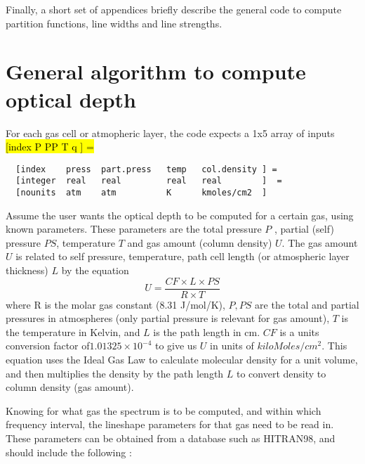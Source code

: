 \documentclass[11pt]{article}
\begin{document}
Finally, a short set of appendices briefly describe the general code to 
compute partition functions, line widths and line strengths. 

\newpage
\section{General algorithm to compute optical depth}
For each gas cell or atmopheric layer, the code expects a 1x5 array of 
inputs \\
\hl{[index   P   PP    T   q     ] = }
\\
\begin{verbatim}
  [index    press  part.press   temp   col.density ] = 
  [integer  real   real         real   real        ]  = 
  [nounits  atm    atm          K      kmoles/cm2  ]
\end{verbatim}

Assume the user wants the optical depth to be computed for a certain gas, 
using known parameters. These parameters are the total pressure $P$ , 
partial (self) pressure $PS$, temperature $T$ and gas amount (column
density) $U$. The gas amount $U$ is related to self pressure, temperature,
path cell length (or atmospheric layer thickness) $L$ by the equation 
\[ 
U = \frac{CF \times L \times PS}{R \times T}
\]
where R is the molar gas constant (8.31 J/mol/K), $P,PS$ are the total and
partial pressures in atmospheres (only partial pressure is relevant for gas
amount), $T$ is the temperature in Kelvin, and $L$ is the path length in cm.  
$CF$ is a units conversion factor of$1.01325 \times 10^{-4}$ to give us $U$ in
units of $kiloMoles/cm^{2}$. This equation uses the Ideal Gas Law to calculate
molecular density for a unit volume, and then multiplies the density by the 
path length $L$ to convert density to column density (gas amount).
 
Knowing for what gas the spectrum is to be computed, and within which 
frequency interval, the lineshape parameters for that gas need to be read 
in. These  parameters can be obtained from a database such as HITRAN98, 
and should include the following : 
\end{document}
